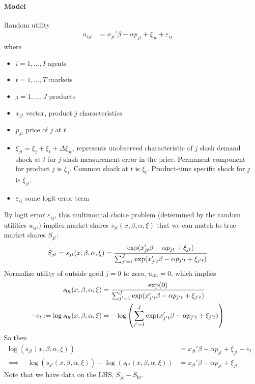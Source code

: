 \documentclass[12pt]{article}
\theoremstyle{plain}
\theoremstyle{definition}
\theoremstyle{remark}
\begin{document}
\paragraph{Model}
Random utility
\begin{align*}
  u_{ijt}
  &=
  x_{jt}'\beta
  - \alpha p_{jt}
  + \xi_{jt}
  + \varepsilon_{ij}
\end{align*}
where
\begin{itemize}
  \item $i=1,\ldots,I$ agents
  \item $t=1,\ldots,T$ markets
  \item $j=1,\ldots,J$ products
  \item $x_{jt}$ vector, product $j$ characteristics
  \item $p_{jt}$ price of $j$ at $t$
  \item $\xi_{jt}=\xi_j + \xi_t + \Delta \xi_{jt}$,
    represents unobserved characteristic of $j$ slash demand shock at
    $t$ for $j$ slash measurement error in the price.
    Permanent component for product $j$ is $\xi_j$.
    Common shock at $t$ is $\xi_t$.
    Product-time specific shock for $j$ is $\xi_{jt}$.
  \item $\varepsilon_{ij}$ some logit error term
\end{itemize}
By logit error $\varepsilon_{ij}$, this multinomial choice problem
(determined by the random utilities $u_{ijt}$) implies market shares
$s_{jt}(x,\beta,\alpha,\xi)$ that we can match to true market shares
$S_{jt}$:
\begin{align*}
  S_{jt} = s_{jt}(x,\beta,\alpha,\xi)
  =
  \frac{%
    \exp(x_{jt}'\beta - \alpha p_{jt} + \xi_{jt})
  }{%
    \sum_{j'=1}^J \exp(x_{j't}'\beta - \alpha p_{j't} + \xi_{j't})
  }
\end{align*}
Normalize utility of outside good $j=0$ to zero, $u_{i0t}=0$, which
implies
\begin{align*}
  s_{0t}(x,\beta,\alpha,\xi)
  &=
  \frac{%
    \exp(0)
  }{%
    \sum_{j'=1}^J \exp(x_{j't}'\beta - \alpha p_{j't} + \xi_{j't})
  }
  \\
  -
  e_t
  :=
  \log
  s_{0t}(x,\beta,\alpha,\xi)
  &=
  -
  \log\left(
    \sum_{j'=1}^J \exp(x_{j't}'\beta - \alpha p_{j't} + \xi_{j't})
  \right)
\end{align*}
So then
\begin{align*}
  \log(s_{jt}(x,\beta,\alpha,\xi))
  &=
  x_{jt}'\beta - \alpha p_{jt} + \xi_{jt}
  + e_t
  \\
  \implies\quad
  \log(s_{jt}(x,\beta,\alpha,\xi))
  -
  \log(s_{0t}(x,\beta,\alpha,\xi))
  &=
  x_{jt}'\beta - \alpha p_{jt} + \xi_{jt}
\end{align*}
Note that we have data on the LHS, $S_{jt}-S_{0t}$.
\end{document}
